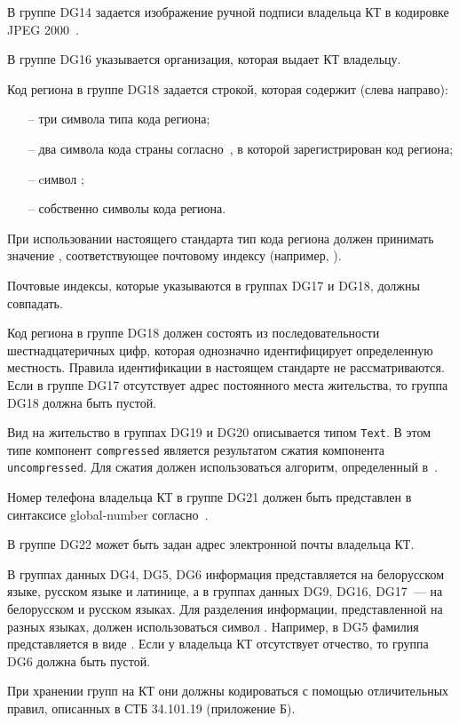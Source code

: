 В группе DG14 задается изображение ручной подписи
владельца КТ в кодировке JPEG 2000~\cite{JPEG2000}.

В группе DG16 указывается организация, которая выдает КТ владельцу. 

Код региона в группе DG18 задается строкой, которая содержит (слева направо):
\begin{itemize}
\item[--]
три символа типа кода региона;
\item[--]
два символа кода страны согласно~\cite{CountryCodes}, в которой зарегистрирован 
код региона;
\item[--]
cимвол \str{-}; 
\item[--]
собственно символы кода региона.
\end{itemize}

При использовании настоящего стандарта тип кода региона
должен принимать значение , соответствующее
почтовому индексу (например, ).

Почтовые индексы, которые указываются в группах DG17 и DG18,
должны совпадать.

Код региона в группе DG18 должен состоять из последовательности 
шестнадцатеричных цифр, которая однозначно идентифицирует определенную 
местность. Правила идентификации в настоящем стандарте не рассматриваются. 
Если в группе DG17 отсутствует адрес постоянного места жительства, то 
группа DG18 должна быть пустой. 
\fi


Вид на жительство в группах DG19 и DG20 описывается типом \verb|Text|. 
В этом типе компонент \verb|compressed| является результатом сжатия компонента 
\verb|uncompressed|. Для сжатия должен использоваться алгоритм, 
определенный в~\cite{DEFLATE}. 
\fi

Номер телефона владельца КТ в группе DG21 должен быть
представлен в синтаксисе global-number согласно~\cite{RFC3966}. 

В группе DG22 может быть задан адрес электронной почты владельца КТ. 

В группах данных DG4, DG5, DG6 информация представляется на 
белорусском языке, русском языке и латинице, 
а в группах данных DG9, DG16, DG17~--- на белорусском и русском языках.
Для разделения информации, представленной на разных языках,
должен использоваться символ \str{/}. Например, в DG5 фамилия 
представляется в виде .
Если у владельца КТ отсутствует отчество, то группа DG6 должна быть пустой. 

При хранении групп на КТ они должны кодироваться с помощью отличительных 
правил, описанных в СТБ 34.101.19 (приложение Б). 

